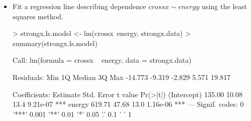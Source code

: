 \documentclass[a4paper]{article}
\begin{document}
\begin{itemize}
\item Fit a regression line describing dependence $crossx\sim energy$ using the least squares method.
\begin{Schunk}
\begin{Sinput}
> strongx.ls.model <- lm(crossx~energy, strongx.data)
> summary(strongx.ls.model)
\end{Sinput}
\begin{Soutput}
Call:
lm(formula = crossx ~ energy, data = strongx.data)

Residuals:
    Min      1Q  Median      3Q     Max 
-14.773  -9.319  -2.829   5.571  19.817 

Coefficients:
            Estimate Std. Error t value Pr(>|t|)    
(Intercept)   135.00      10.08    13.4 9.21e-07 ***
energy        619.71      47.68    13.0 1.16e-06 ***
---
Signif. codes:  0 '***' 0.001 '**' 0.01 '*' 0.05 '.' 0.1 ' ' 1


\end{Soutput}
\end{Schunk}
\end{itemize}
\end{document}
